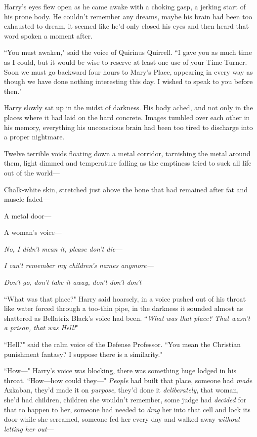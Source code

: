 

\hplettrineextrapara
Harry's eyes flew open as he came awake with a choking gasp, a jerking start of his prone body. He couldn't remember any dreams, maybe his brain had been too exhausted to dream, it seemed like he'd only closed his eyes and then heard that word spoken a moment after.

``You must awaken," said the voice of Quirinus Quirrell. ``I gave you as much time as I could, but it would be wise to reserve at least one use of your Time-Turner. Soon we must go backward four hours to Mary's Place, appearing in every way as though we have done nothing interesting this day. I wished to speak to you before then."

Harry slowly sat up in the midst of darkness. His body ached, and not only in the places where it had laid on the hard concrete. Images tumbled over each other in his memory, everything his unconscious brain had been too tired to discharge into a proper nightmare.

Twelve terrible voids floating down a metal corridor, tarnishing the metal around them, light dimmed and temperature falling as the emptiness tried to suck all life out of the world—

Chalk-white skin, stretched just above the bone that had remained after fat and muscle faded—

A metal door—

A woman's voice—

\emph{No, I didn't mean it, please don't die—}

\emph{I can't remember my children's names anymore—}

\emph{Don't go, don't take it away, don't don't don't—}

``What was that place?" Harry said hoarsely, in a voice pushed out of his throat like water forced through a too-thin pipe, in the darkness it sounded almost as shattered as Bellatrix Black's voice had been. ``\emph{What was that place? That wasn't a prison, that was \emph{Hell!}}"

``Hell?" said the calm voice of the Defense Professor. ``You mean the Christian punishment fantasy? I suppose there is a similarity."

``How—" Harry's voice was blocking, there was something huge lodged in his throat. ``How—how could they—" \emph{People} had built that place, someone had \emph{made} Azkaban, they'd made it on \emph{purpose}, they'd done it \emph{deliberately}, that woman, she'd had children, children she wouldn't remember, some judge had \emph{decided} for that to happen to her, someone had needed to \emph{drag} her into that cell and lock its door while she screamed, someone fed her every day and walked away \emph{without letting her out}—

